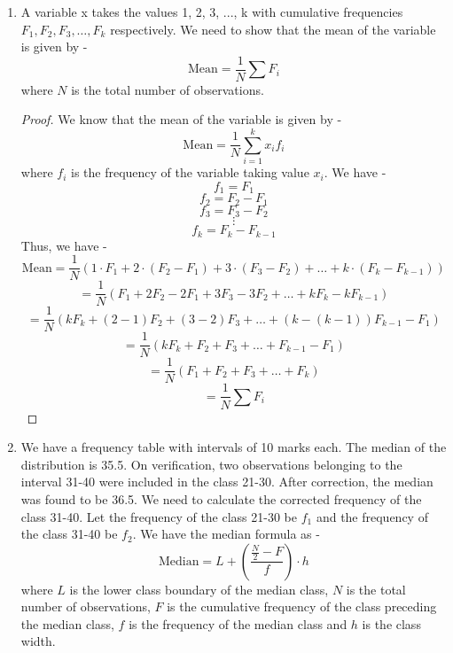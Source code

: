 \begin{enumerate}
    \[\frac{m}{f} = \frac{600}{200} = 3\]
    Thus, we have -
    \begin{enumerate}
        \item Percentage of male workers -
        \[\frac{m}{m + f} \cdot 100 = \frac{3f}{3f + f} \cdot 100 = \frac{3}{4} \cdot 100 = 75\%\]
        \[\boxed{75\%}\]
        \item Percentage of female workers -
        \[\frac{f}{m + f} \cdot 100 = \frac{f}{3f + f} \cdot 100 = \frac{1}{4} \cdot 100 = 25\%\]
        \[\boxed{25\%}\]
    \end{enumerate}
    \item A variable x takes the values 1, 2, 3, ..., k with cumulative frequencies $F_1, F_2, F_3, \ldots, F_k$ respectively. We need to show that the mean of the variable is given by -
    \[\text{Mean} = \frac{1}{N} \sum F_i\]
    where $N$ is the total number of observations. 
    \begin{proof}    
    We know that the mean of the variable is given by -
    \[\text{Mean} = \frac{1}{N} \sum_{i=1}^{k} x_i f_i\]
    where $f_i$ is the frequency of the variable taking value $x_i$. We have -
    \[f_1 = F_1\]
    \[f_2 = F_2 - F_1\]
    \[f_3 = F_3 - F_2\]
    \[\vdots\]
    \[f_k = F_k - F_{k-1}\]
    Thus, we have -
    \[\text{Mean} = \frac{1}{N} \left(1 \cdot F_1 + 2 \cdot (F_2 - F_1) + 3 \cdot (F_3 - F_2) + \ldots + k \cdot (F_k - F_{k-1})\right)\]
    \[= \frac{1}{N} \left(F_1 + 2F_2 - 2F_1 + 3F_3 - 3F_2 + \ldots + kF_k - kF_{k-1}\right)\]
    \[= \frac{1}{N} \left(kF_k + (2 - 1)F_2 + (3 - 2)F_3 + \ldots + (k - (k-1))F_{k-1} - F_1\right)\]
    \[= \frac{1}{N} \left(kF_k + F_2 + F_3 + \ldots + F_{k-1} - F_1\right)\]
    \[= \frac{1}{N} \left(F_1 + F_2 + F_3 + \ldots + F_k\right)\]
    \[\boxed{= \frac{1}{N} \sum F_i
    }\]
    \end{proof}
    \item We have a frequency table with intervals of 10 marks each. The median of the distribution is 35.5. On verification, two observations belonging to the interval 31-40 were included in the class 21-30. After correction, the median was found to be 36.5. We need to calculate the corrected frequency of the class 31-40. 
    Let the frequency of the class 21-30 be $f_1$ and the frequency of the class 31-40 be $f_2$. We have the median formula as -
    \[\text{Median} = L + \left(\frac{\frac{N}{2} - F}{f}\right) \cdot h\]
    where $L$ is the lower class boundary of the median class, $N$ is the total number of observations, $F$ is the cumulative frequency of the class preceding the median class, $f$ is the frequency of the median class and $h$ is the class width. \\

\end{enumerate}
